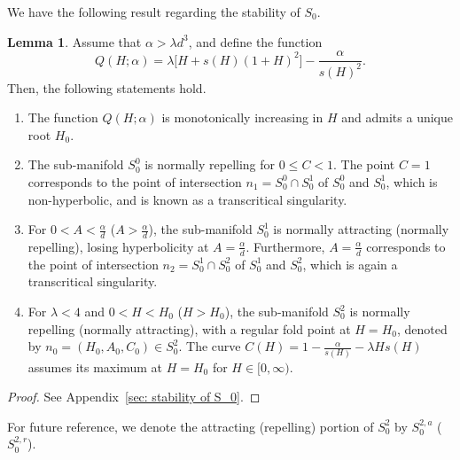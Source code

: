 \documentclass{article}
\theoremstyle{definition}
\numberwithin{equation}{section}
\newtheorem{lem}[prop]{Lemma}
\begin{document}
We have the following result regarding the stability of $S_0$.
\begin{lem}
    Assume that $\alpha>\lambda d^3$, and define the function
    \begin{equation}
        Q(H;\alpha)=\lambda \big[H+s(H)(1+H)^2\big]-\frac{\alpha}{s(H)^2}.
    \end{equation}
    Then, the following statements hold.
    \begin{enumerate}
        \item The function $Q(H;\alpha)$ is monotonically increasing in $H$ and admits a unique root $H_0$.
        \item The sub-manifold $S_0^0$ is normally repelling for $0\leq C<1$.
        The point $C=1$ corresponds to the point of intersection $n_1=S_0^0\cap S_0^1$ of $S_0^0$ and $S_0^1$, which is non-hyperbolic, and is known as a transcritical singularity.
        \item For $0<A<\frac{\alpha}{d}$ \big($A>\frac{\alpha}{d}$\big), the sub-manifold $S_0^1$ is normally attracting (normally repelling), losing hyperbolicity at $A=\frac{\alpha}{d}$. Furthermore, $A=\frac{\alpha}{d}$ corresponds to the point of intersection $n_2=S_0^1\cap S_0^2$ of $S_0^1$ and $S_0^2$, which is again a transcritical singularity. 
        \item For $\lambda< 4$ and $0<H<H_0$ ($H>H_0$), the sub-manifold $S_0^2$ is normally repelling (normally attracting), with a regular fold point at $H=H_0$, denoted by $n_0=(H_0, A_0, C_0)\in S_0^2$. The curve $C(H)=1-\frac{\alpha}{s(H)}-\lambda H s(H)$ assumes its maximum at $H=H_0$ for $H\in[0, \infty)$.
    \end{enumerate}
\label{lemma: Stability of Critical Manifold}
\end{lem}
\begin{proof}
    See Appendix~\ref{sec: stability of S_0}.
\end{proof}

For future reference, we denote the attracting (repelling) portion of $S_0^2$ by  $S_{0}^{2,a}$ \big($S_{0}^{2,r}$\big).
\end{document}
